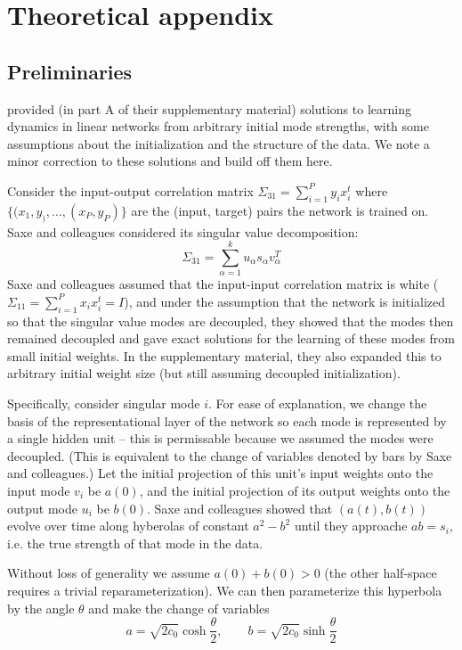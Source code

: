 \documentclass{article}
\begin{document}
\section{Theoretical appendix}
\subsection{Preliminaries}
\citet{Saxe2014} provided (in part A of their supplementary material) solutions to learning dynamics in linear networks from arbitrary initial mode strengths, with some assumptions about the initialization and the structure of the data. We note a minor correction to these solutions and build off them here. \par
Consider the input-output correlation matrix $\Sigma_{31} = \sum_{i=1}^P y_ix_i^t$ where $\{(x_1, y_), ..., (x_P, y_P)\}$ are the (input, target) pairs the network is trained on. Saxe and colleagues considered its singular value decomposition:
$$\Sigma_{31} = \sum_{\alpha=1}^{k} u_\alpha s_\alpha v_\alpha^T$$
Saxe and colleagues assumed that the input-input correlation matrix is white ($\Sigma_11 = \sum_{i=1}^P x_i x_i^t = I$), and under the assumption that the network is initialized so that the singular value modes are decoupled, they showed that the modes then remained decoupled and gave exact solutions for the learning of these modes from small initial weights. In the supplementary material, they also expanded this to arbitrary initial weight size (but still assuming decoupled initialization). \par
Specifically, consider singular mode $i$. For ease of explanation, we change the basis of the representational layer of the network so each mode is represented by a single hidden unit -- this is permissable because we assumed the modes were decoupled. (This is equivalent to the change of variables denoted by bars by Saxe and colleagues.) Let the initial projection of this unit's input weights onto the input mode $v_i$ be $a(0)$, and the initial projection of its output weights onto the output mode $u_i$ be $b(0)$. Saxe and colleagues showed that $(a(t), b(t))$ evolve over time along hyberolas of constant $a^2-b^2$ until they approache $ab = s_i$, i.e. the true strength of that mode in the data. \par
Without loss of generality we assume $a(0) + b(0) > 0$ (the other half-space requires a trivial reparameterization). We can then parameterize this hyperbola by the angle $\theta$ and make the change of variables
$$a = \sqrt{2c_0} \cosh \frac{\theta}{2}, \qquad b = \sqrt{2c_0} \sinh \frac{\theta}{2}$$
\end{document}
